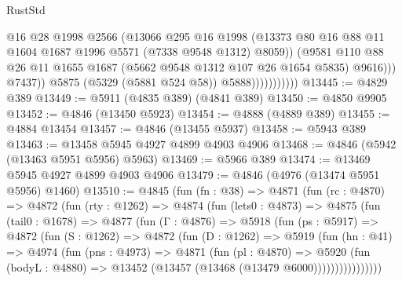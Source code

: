 \begin{lexlean}{RustStd}
\begin{coremodule}
                                  @16
                                  @28
                                  @1998
                                  @2566
                                  (@13066
                                    @295
                                    @16
                                    @1998
                                    (@13373
                                      @80
                                      @16
                                      @88
                                      @11
                                      @1604
                                      @1687
                                      @1996
                                      @5571
                                      (@7338 @9548 @1312)
                                      @8059))
                                  (@9581
                                    @110
                                    @88
                                    @26
                                    @11
                                    @1655
                                    @1687
                                    (@5662 @9548 @1312 @107 @26 @1654 @5835)
                                    @9616)))
                              @7437))
                          @5875
                          (@5329 (@5881 @524 @58))
                          @5888)))))))))))
@13445 := @4829 @389
@13449 := @5911 (@4835 @389) (@4841 @389)
@13450 := @4850 @9905
@13452 := @4846 (@13450 @5923)
@13454 := @4888 (@4889 @389)
@13455 := @4884 @13454
@13457 := @4846 (@13455 @5937)
@13458 := @5943 @389
@13463 := @13458 @5945 @4927 @4899 @4903 @4906
@13468 := @4846 (@5942 (@13463 @5951 @5956) @5963)
@13469 := @5966 @389
@13474 := @13469 @5945 @4927 @4899 @4903 @4906
@13479 := @4846 (@4976 (@13474 @5951 @5956) @1460)
@13510 := @4845
    (fun (fn : @38) =>
    @4871
      (fun (rc : @4870) =>
      @4872
        (fun (rty : @1262) =>
        @4874
          (fun (lets0 : @4873) =>
          @4875
            (fun (tail0 : @1678) =>
            @4877
              (fun (Γ : @4876) =>
              @5918
                (fun (ps : @5917) =>
                @4872
                  (fun (S : @1262) =>
                  @4872
                    (fun (D : @1262) =>
                    @5919
                      (fun (hn : @41) =>
                      @4974
                        (fun (pns : @4973) =>
                        @4871
                          (fun (pl : @4870) =>
                          @5920
                            (fun (bodyL : @4880) =>
                            @13452 (@13457 (@13468 (@13479 @6000))))))))))))))))

\end{coremodule}
\end{lexlean}
